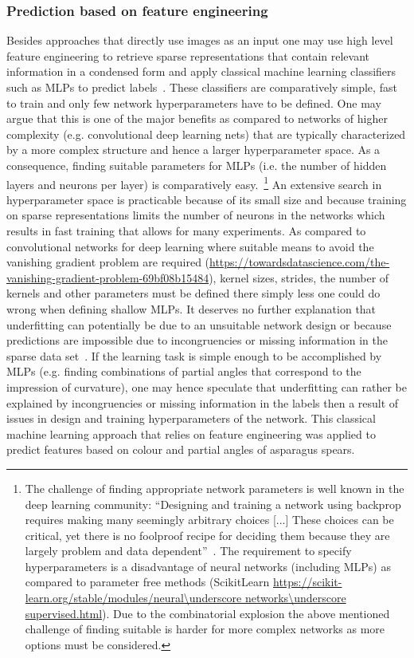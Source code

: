 \subsubsection{Prediction based on feature engineering}
\label{subsec:FeatureEngineering}

Besides approaches that directly use images as an input one may use high level feature engineering to retrieve sparse representations that contain relevant information in a condensed form and apply classical machine learning classifiers such as MLPs to predict labels~\citep{zheng2018feature}. These classifiers are comparatively simple, fast to train and only few network hyperparameters have to be defined. One may argue that this is one of the major benefits as compared to networks of higher complexity (e.g. convolutional deep learning nets) that are typically characterized by a more complex structure and hence a larger hyperparameter space. As a consequence, finding suitable parameters for MLPs (i.e. the number of hidden layers and neurons per layer) is comparatively easy.~\footnote{The challenge of finding appropriate network parameters is well known in the deep learning community: “Designing and training a network using backprop requires making many seemingly arbitrary choices [...] These choices can be critical, yet there is no foolproof recipe for deciding them because they are largely problem and data dependent”~\citep{lecun2012efficient}. The requirement to specify hyperparameters is a disadvantage of neural networks (including MLPs) as compared to parameter free methods (ScikitLearn \url{https://scikit-learn.org/stable/modules/neural\underscore networks\underscore supervised.html}). Due to the combinatorial explosion the above mentioned challenge of finding suitable is harder for more complex networks as more options must be considered.} An extensive search in hyperparameter space is practicable because of its small size and because training on sparse representations limits the number of neurons in the networks which results in fast training that allows for many experiments. As compared to convolutional networks for deep learning where suitable means to avoid the vanishing gradient problem are required (\url{https://towardsdatascience.com/the-vanishing-gradient-problem-69bf08b15484}), kernel sizes, strides, the number of kernels and other parameters must be defined there simply less one could do wrong when defining shallow MLPs. It deserves no further explanation that underfitting can potentially be due to an unsuitable network design or because predictions are impossible due to incongruencies or missing information in the sparse data set~\citep{lecun2012efficient}. If the learning task is simple enough to be accomplished by MLPs (e.g. finding combinations of partial angles that correspond to the impression of curvature), one may hence speculate that underfitting can rather be explained by incongruencies or missing information in the labels then a result of issues in design and training hyperparameters of the network. This classical machine learning approach that relies on feature engineering was applied to predict features based on colour and partial angles of asparagus spears.
